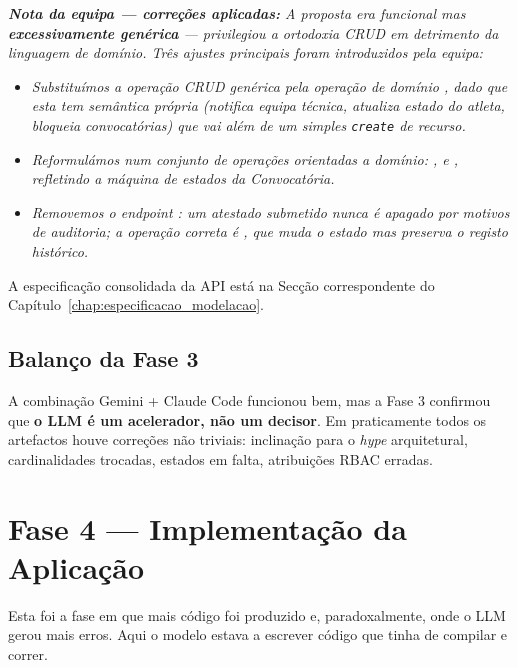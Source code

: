 \noindent\textit{\textbf{Nota da equipa --- correções aplicadas:} A proposta era funcional mas \textbf{excessivamente genérica} --- privilegiou a ortodoxia CRUD em detrimento da linguagem de domínio. Três ajustes principais foram introduzidos pela equipa:}
\begin{itemize}
    \item \textit{Substituímos a operação CRUD genérica  pela operação de domínio , dado que esta tem semântica própria (notifica equipa técnica, atualiza estado do atleta, bloqueia convocatórias) que vai além de um simples \texttt{create} de recurso.}
    \item \textit{Reformulámos  num conjunto de operações orientadas a domínio: ,  e , refletindo a máquina de estados da Convocatória.}
    \item \textit{Removemos o \textit{endpoint} : um atestado submetido nunca é apagado por motivos de auditoria; a operação correta é , que muda o estado mas preserva o registo histórico.}
\end{itemize}

A especificação consolidada da API está na Secção correspondente do Capítulo~\ref{chap:especificacao_modelacao}.

\subsection{Balanço da Fase 3}

A combinação Gemini + Claude Code funcionou bem, mas a Fase 3 confirmou que \textbf{o LLM é um acelerador, não um decisor}. Em praticamente todos os artefactos houve correções não triviais: inclinação para o \textit{hype} arquitetural, cardinalidades trocadas, estados em falta, atribuições RBAC erradas.

\section{Fase 4 --- Implementação da Aplicação}\label{sec:ia_implementacao}

Esta foi a fase em que mais código foi produzido e, paradoxalmente, onde o LLM gerou mais erros. Aqui o modelo estava a escrever código que tinha de compilar e correr.

